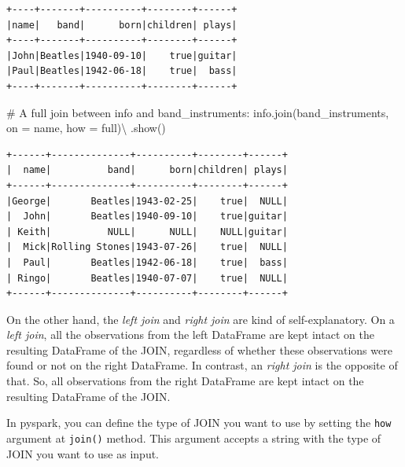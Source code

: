 \documentclass[
  11pt,
  letterpaper,
  DIV=11,
  numbers=noendperiod]{scrreprt}
\newenvironment{Shaded}{\begin{snugshade}}{\end{snugshade}}
\newcommand{\CommentTok}[1]{\textcolor[rgb]{0.37,0.37,0.37}{#1}}
\newcommand{\NormalTok}[1]{\textcolor[rgb]{0.00,0.23,0.31}{#1}}
\newcommand{\OperatorTok}[1]{\textcolor[rgb]{0.37,0.37,0.37}{#1}}
\newcommand{\StringTok}[1]{\textcolor[rgb]{0.13,0.47,0.30}{#1}}
\begin{document}
\begin{verbatim}
+----+-------+----------+--------+------+
|name|   band|      born|children| plays|
+----+-------+----------+--------+------+
|John|Beatles|1940-09-10|    true|guitar|
|Paul|Beatles|1942-06-18|    true|  bass|
+----+-------+----------+--------+------+
\end{verbatim}

\begin{Shaded}
\begin{Highlighting}[]
\CommentTok{\# A full join between \textasciigrave{}info\textasciigrave{} and \textasciigrave{}band\_instruments\textasciigrave{}:}
\NormalTok{info.join(band\_instruments, on }\OperatorTok{=} \StringTok{\textquotesingle{}name\textquotesingle{}}\NormalTok{, how }\OperatorTok{=} \StringTok{\textquotesingle{}full\textquotesingle{}}\NormalTok{)}\OperatorTok{\textbackslash{}}
\NormalTok{    .show()}
\end{Highlighting}
\end{Shaded}

\begin{verbatim}
+------+--------------+----------+--------+------+
|  name|          band|      born|children| plays|
+------+--------------+----------+--------+------+
|George|       Beatles|1943-02-25|    true|  NULL|
|  John|       Beatles|1940-09-10|    true|guitar|
| Keith|          NULL|      NULL|    NULL|guitar|
|  Mick|Rolling Stones|1943-07-26|    true|  NULL|
|  Paul|       Beatles|1942-06-18|    true|  bass|
| Ringo|       Beatles|1940-07-07|    true|  NULL|
+------+--------------+----------+--------+------+
\end{verbatim}

On the other hand, the \emph{left join} and \emph{right join} are kind
of self-explanatory. On a \emph{left join}, all the observations from
the left DataFrame are kept intact on the resulting DataFrame of the
JOIN, regardless of whether these observations were found or not on the
right DataFrame. In contrast, an \emph{right join} is the opposite of
that. So, all observations from the right DataFrame are kept intact on
the resulting DataFrame of the JOIN.

In pyspark, you can define the type of JOIN you want to use by setting
the \texttt{how} argument at \texttt{join()} method. This argument
accepts a string with the type of JOIN you want to use as input.
\end{document}
